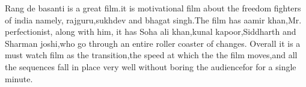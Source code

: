 \documentclass{article}
\author{raj kumar meena}
\begin{document}
Rang de basanti is a great film.it is motivational film about the freedom fighters of india namely, rajguru,sukhdev and bhagat singh.The film has aamir khan,Mr. perfectionist, along with him, it has Soha ali khan,kunal kapoor,Siddharth and Sharman joshi,who go through an entire roller coaster of changes.
Overall it is a must watch film as the transition,the speed at which the the film moves,and all the sequences fall in place very well without boring the audiencefor for a single minute.
\end{document}
